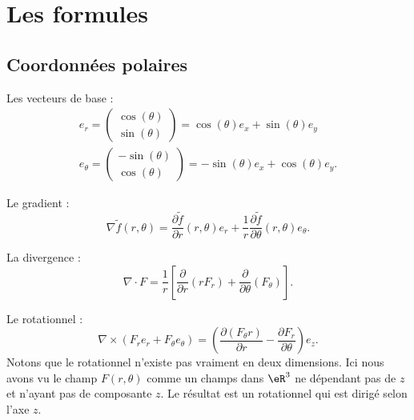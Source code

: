 \section{Les formules}

\subsection{Coordonnées polaires}

Les vecteurs de base :
\begin{subequations}
    \begin{align}
    e_r=\begin{pmatrix}
        \cos(\theta)    \\ 
        \sin(\theta)    
    \end{pmatrix}=\cos(\theta)e_x+\sin(\theta)e_y\\
    e_{\theta}=\begin{pmatrix}
        -\sin(\theta)    \\ 
        \cos(\theta)    
    \end{pmatrix}=-\sin(\theta)e_x+\cos(\theta)e_y.
    \end{align}
\end{subequations}

Le gradient :
\begin{equation}
    \nabla\tilde f(r,\theta)=\frac{ \partial \tilde f }{ \partial r }(r,\theta)e_r+\frac{1}{ r }\frac{ \partial \tilde f }{ \partial \theta }(r,\theta)e_{\theta}.
\end{equation}

La divergence :
\begin{equation} 
    \nabla\cdot F=\frac{1}{ r }\left[ \frac{ \partial  }{ \partial r }(rF_r)+\frac{ \partial  }{ \partial \theta }(F_{\theta}) \right].
\end{equation}

Le rotationnel :
\begin{equation}    
    \nabla\times(F_re_r+F_{\theta}e_{\theta})=\left( \frac{ \partial (F_{\theta} r) }{ \partial r }-\frac{ \partial F_r }{ \partial \theta } \right)e_z.
\end{equation}
Notons que le rotationnel n'existe pas vraiment en deux dimensions. Ici nous avons vu le champ \( F(r,\theta)\) comme un champs dans \( \eR^3\) ne dépendant pas de \( z\) et n'ayant pas de composante \( z\). Le résultat est un rotationnel qui est dirigé selon l'axe \( z\).


